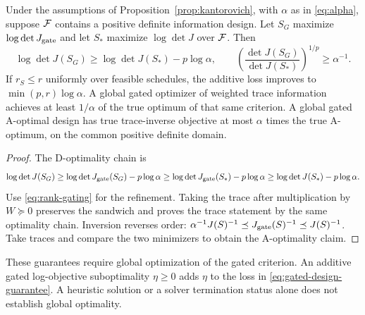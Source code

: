 \begin{corollary}
\label{cor:gated-design}
Under the assumptions of Proposition~\ref{prop:kantorovich}, with $\alpha$
as in \eqref{eq:alpha}, suppose $\mathcal F$ contains a positive definite information
design. Let $S_G$
maximize $\log\det J_{\mathrm{gate}}$ and let $S_*$ maximize $\log\det J$ over
$\mathcal F$. Then
\begin{equation}
 \log\det J(S_G)\ge\log\det J(S_*)-p\log\alpha,\qquad
 \left(\frac{\det J(S_G)}{\det J(S_*)}\right)^{1/p}\ge\alpha^{-1}.
 \label{eq:gated-design-guarantee}
\end{equation}
If $r_S\le r$ uniformly over feasible schedules, the additive loss improves
to $\min(p,r)\log\alpha$. A global gated optimizer of weighted trace
information achieves at least $1/\alpha$ of the true optimum of that same
criterion. A global gated A-optimal design has true trace-inverse objective
at most $\alpha$ times the true A-optimum, on the common positive definite
domain.
\end{corollary}
\begin{proof}
The D-optimality chain is
\[
 \log\det J(S_G)\ge\log\det J_{\mathrm{gate}}(S_G)-p\log\alpha
 \ge\log\det J_{\mathrm{gate}}(S_*)-p\log\alpha
 \ge\log\det J(S_*)-p\log\alpha.
\]
Use \eqref{eq:rank-gating} for the refinement. Taking the trace after
multiplication by $W\succeq0$ preserves the sandwich and proves the trace
statement by the same optimality chain. Inversion reverses order:
$\alpha^{-1}J(S)^{-1}\preceq J_{\mathrm{gate}}(S)^{-1}\preceq J(S)^{-1}$.
Take traces and compare the two minimizers to obtain the A-optimality claim.
\end{proof}
These guarantees require global optimization of the gated criterion. An
additive gated log-objective suboptimality $\eta\ge0$ adds $\eta$ to the
loss in \eqref{eq:gated-design-guarantee}. A heuristic solution or a solver
termination status alone does not establish global optimality.


